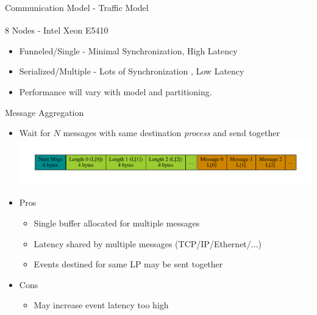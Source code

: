 \documentclass[10pt]{beamer}
\begin{document}
\begin{frame}{Communication Model - Traffic Model}
\begin{block}{8 Nodes - Intel\textsuperscript{\textregistered} Xeon\textsuperscript{\textregistered} E5410}
\begin{minipage}{0.5\textwidth}
        \end{minipage}
        \begin{itemize}
            \item Funneled/Single - Minimal Synchronization, High Latency
            \item Serialized/Multiple - Lots of Synchronization , Low Latency
            \item Performance will vary with model and partitioning.
        \end{itemize}
    \end{block}
\end{frame}

\begin{frame}{Message Aggregation}
    \begin{itemize}
        \item Wait for $N$ messages with same destination \emph{process} and send together
        \includegraphics[width=\textwidth]{../figs/graphviz/aggregation_format.pdf}
        \item Pros
            \begin{itemize}
                \item Single buffer allocated for multiple messages
                \item Latency shared by multiple messages (TCP/IP/Ethernet/...)
                \item Events destined for same LP may be sent together
            \end{itemize}
        \item Cons
            \begin{itemize}
                \item May increase event latency too high
            \end{itemize}
    \end{itemize}
\end{frame}
\end{document}

